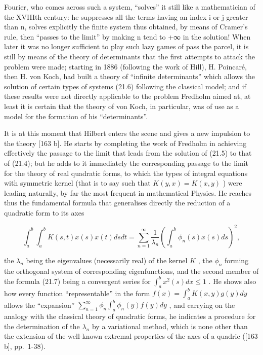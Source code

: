 Fourier, who comes across such a system, ``solves'' it still like a mathematician of the XVIIIth century: he suppresses all the terms having an index i or j greater than n, solves explicitly the finite system thus obtained, by means of Cramer's rule, then ``passes to the limit'' by making n tend to +∞ in the solution! When later it was no longer sufficient to play such lazy games of pass the parcel, it is still by means of the theory of determinants that the first attempts to attack the problem were made; starting in 1886 (following the work of Hill), H. Poincaré, then H. von Koch, had built a theory of ``infinite determinants'' which allows the solution of certain types of systems (21.6) following the classical model; and if these results were not directly applicable to the problem Fredholm aimed at, at least it is certain that the theory of von Koch, in particular, was of use as a model for the formation of his ``determinants''.

It is at this moment that Hilbert enters the scene and gives a new impulsion to the theory {[}163 b{]}. He starts by completing the work of Fredholm in achieving effectively the passage to the limit that leads from the solution of (21.5) to that of (21.4); but he adds to it immediately the corresponding passage to the limit for the theory of real quadratic forms, to which the types of integral equations with symmetric kernel (that is to say such that \(K(y, x) = K(x, y)\) ) were leading naturally, by far the most frequent in mathematical Physics. He reaches thus the fundamental formula that generalises directly the reduction of a quadratic form to its axes

\[
\int_ {a} ^ {b} \int_ {a} ^ {b} K (s, t) x (s) x (t) d s d t = \sum_ {n = 1} ^ {\infty} \frac {1}{\lambda_ {n}} \left(\int_ {a} ^ {b} \phi_ {n} (s) x (s) d s\right) ^ {2},\tag{21.7}
\]

the \(\lambda_{n}\) being the eigenvalues (necessarily real) of the kernel \(K\) , the \(\phi_{n}\) forming the orthogonal system of corresponding eigenfunctions, and the second member of the formula (21.7) being a convergent series for \(\int_{a}^{b} x^{2}(s) dx \leq 1\) . He shows also how every function ``representable'' in the form \(f(x) = \int_{a}^{b} K(x, y) g(y) dy\) allows the ``expansion'' \(\sum_{n=1}^{\infty} \phi_{n} \int_{a}^{b} \phi_{n}(y) f(y) dy\) , and carrying on the analogy with the classical theory of quadratic forms, he indicates a procedure for the determination of the \(\lambda_{n}\) by a variational method, which is none other than the extension of the well-known extremal properties of the axes of a quadric ({[}163 b{]}, pp.~1-38).


